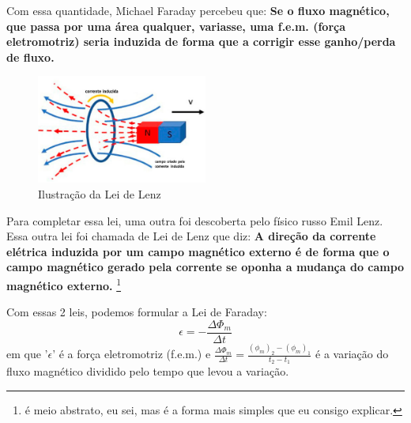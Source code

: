 \documentclass[12pt]{extarticle}
\newcommand{\<}{\langle}
\renewcommand{\>}{\rangle}
\theoremstyle{definition}
\begin{document}
Com essa quantidade, Michael Faraday percebeu que: \textbf{Se o fluxo magnético, que passa por uma área qualquer, variasse, uma f.e.m. (força eletromotriz) seria induzida de forma que a corrigir esse ganho/perda de fluxo.}
\begin{figure}[H]
    \centering
    \includegraphics[width=0.5\textwidth]{corrente-induzida02.jpg}
    \caption{Ilustração da Lei de Lenz}
    \label{fig:lei_de_lenz}
\end{figure}

Para completar essa lei, uma outra foi descoberta pelo físico russo Emil Lenz. Essa outra lei foi chamada de Lei de Lenz que diz: \textbf{A direção da corrente elétrica induzida por um campo magnético externo é de forma que o campo magnético gerado pela corrente se oponha a mudança do campo magnético externo.} \footnote{é meio abstrato, eu sei, mas é a forma mais simples que eu consigo explicar.}

Com essas 2 leis, podemos formular a Lei de Faraday:
\begin{equation}
    \epsilon = - \frac{\Delta \Phi_m}{\Delta t} 
\end{equation}
\noindent em que '$\epsilon$' é a força eletromotriz (f.e.m.) e $\frac{\Delta \Phi_m}{\Delta t} = \frac{(\phi_m)_2 -(\phi_m)_1}{t_2 - t_1}$ é a variação do fluxo magnético dividido pelo tempo que levou a variação.
\end{document}
